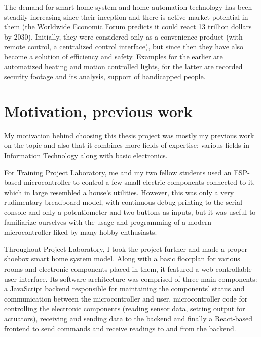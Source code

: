 The demand for smart home system and home automation technology has been steadily increasing since their inception and there is active market potential in them (the Worldwide Economic Forum predicts it could react 13 trillion dollars by 2030). Initially, they were considered only as a convenience product (with remote control, a centralized control interface), but since then they have also become a solution of efficiency and safety. Examples for the earlier are automatized heating and motion controlled lights, for the latter are recorded security footage and its analysis, support of handicapped people.


\section{Motivation, previous work}
My motivation behind choosing this thesis project was mostly my previous work on the topic and also that it combines more fields of expertise: various fields in Information Technology along with basic electronics.\break

For Training Project Laboratory, me and my two fellow students used an ESP-based microcontroller to control a few small electric components connected to it, which in large resembled a house's utilities. However, this was only a very rudimentary breadboard model, with continuous debug printing to the serial console and only a potentiometer and two buttons as inputs, but it was useful to familiarize ourselves with the usage and programming of a modern microcontroller liked by many hobby enthusiasts.\break

Throughout Project Laboratory, I took the project further and made a proper shoebox smart home system model. Along with a basic floorplan for various rooms and electronic components placed in them, it featured a web-controllable user interface. Its software architecture was comprised of three main components: a JavaScript backend responsible for maintaining the components' status and communication between the microcontroller and user, microcontroller code for controlling the electronic components (reading sensor data, setting output for actuators), receiving and sending data to the backend and finally a React-based frontend to send commands and receive readings to and from the backend. \break


